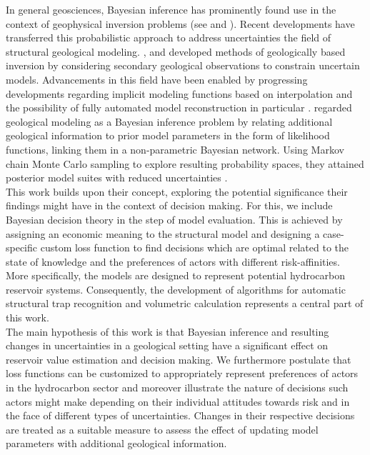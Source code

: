 In general geosciences, Bayesian inference has prominently found use in the context of geophysical inversion problems (see \citet{tarantola1982inverse, mosegaard2002probabilistic} and \citet{sambridge2002monte}). Recent developments have transferred this probabilistic approach to address uncertainties the field of structural geological modeling. \citet{Caumon2010}, \citet{jessell2010towards} and \citet{Wellmann2010b} developed methods of geologically based inversion by considering secondary geological observations to constrain uncertain models.  Advancements in this field have been enabled by progressing developments regarding implicit modeling functions based on interpolation and the possibility of fully automated model reconstruction in particular \citep{hillier2014three, mallet1992discrete, lajaunie1997foliation}. \citet{delaVarga2016} regarded geological modeling as a Bayesian inference problem by relating additional geological information to prior model parameters in the form of likelihood functions, linking them in a non-parametric Bayesian network. Using Markov chain Monte Carlo sampling to explore resulting probability spaces, they attained posterior model suites with reduced uncertainties \citep{delaVarga2016}.\\
This work builds upon their concept, exploring the potential significance their findings might have in the context of decision making. For this, we include Bayesian decision theory in the step of model evaluation. This is achieved by assigning an economic meaning to the structural model and designing a case-specific custom loss function to find decisions which are optimal related to the state of knowledge and the preferences of actors with different risk-affinities. More specifically, the models are designed to represent potential hydrocarbon reservoir systems. Consequently, the development of algorithms for automatic structural trap recognition and volumetric calculation represents a central part of this work.\\
The main hypothesis of this work is that Bayesian inference and resulting changes in uncertainties in a geological setting have a significant effect on reservoir value estimation and decision making. We furthermore postulate that loss functions can be customized to appropriately represent preferences of actors in the hydrocarbon sector and moreover illustrate the nature of decisions such actors might make depending on their individual attitudes towards risk and in the face of different types of uncertainties. Changes in their respective decisions are treated as a suitable measure to assess the effect of updating model parameters with additional geological information.